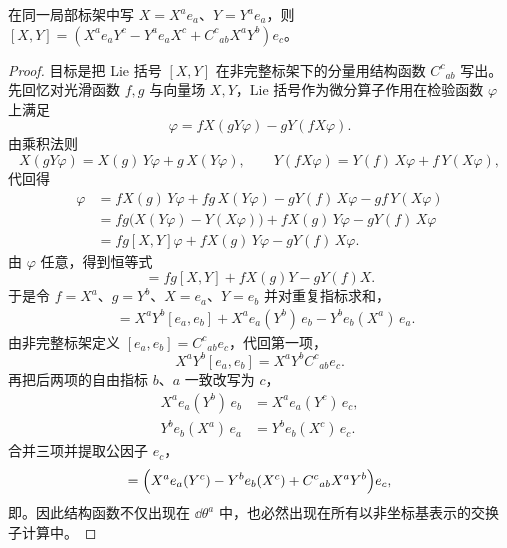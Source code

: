 \begin{proposition}
在同一局部标架中写 $X=X^ae_a$、$Y=Y^ae_a$，则 $[X,Y]=(X^ae_aY^c-Y^ae_aX^c+C^c{}_{ab}X^aY^b)e_c$。
\end{proposition}
\begin{proof}
目标是把 Lie 括号 $[X,Y]$ 在非完整标架下的分量用结构函数 $C^c{}_{ab}$ 写出。先回忆对光滑函数 $f,g$ 与向量场 $X,Y$，Lie 括号作为微分算子作用在检验函数 $\varphi$ 上满足
\begin{equation*}
[fX,gY]\varphi
=fX(gY\varphi)-gY(fX\varphi).
\end{equation*}
由乘积法则
\begin{equation*}
X(gY\varphi)=X(g)\,Y\varphi+g\,X(Y\varphi),
\qquad
Y(fX\varphi)=Y(f)\,X\varphi+f\,Y(X\varphi),
\end{equation*}
代回得
\begin{align*}
[fX,gY]\varphi
&=fX(g)\,Y\varphi+fg\,X(Y\varphi)
 -gY(f)\,X\varphi-gf\,Y(X\varphi)\\
&=fg\bigl(X(Y\varphi)-Y(X\varphi)\bigr)
 +fX(g)\,Y\varphi-gY(f)\,X\varphi\\
&=fg[X,Y]\varphi+fX(g)\,Y\varphi-gY(f)\,X\varphi.
\end{align*}
由 $\varphi$ 任意，得到恒等式
\begin{equation*}
[fX,gY]=fg[X,Y]+fX(g)Y-gY(f)X.
\end{equation*}
于是令 $f=X^a$、$g=Y^b$、$X=e_a$、$Y=e_b$ 并对重复指标求和，
\begin{align*}
[X^ae_a,Y^be_b]
&=X^aY^b[e_a,e_b]
 +X^ae_a(Y^b)\,e_b
 -Y^be_b(X^a)\,e_a.
\end{align*}
由非完整标架定义 $[e_a,e_b]=C^c{}_{ab}e_c$，代回第一项，
\begin{equation*}
X^aY^b[e_a,e_b]
=X^aY^bC^c{}_{ab}e_c.
\end{equation*}
再把后两项的自由指标 $b$、$a$ 一致改写为 $c$，
\begin{align*}
X^ae_a(Y^b)\,e_b
&=X^ae_a(Y^c)\,e_c,\\
Y^be_b(X^a)\,e_a
&=Y^be_b(X^c)\,e_c.
\end{align*}
合并三项并提取公因子 $e_c$，
\begin{equation*}
[X,Y]
=\Bigl(
 X^ae_a(Y^c)-Y^be_b(X^c)
 +C^c{}_{ab}X^aY^b
\Bigr)e_c,
\end{equation*}
即。因此结构函数不仅出现在 $\dd\theta^a$ 中，也必然出现在所有以非坐标基表示的交换子计算中。
\end{proof}

